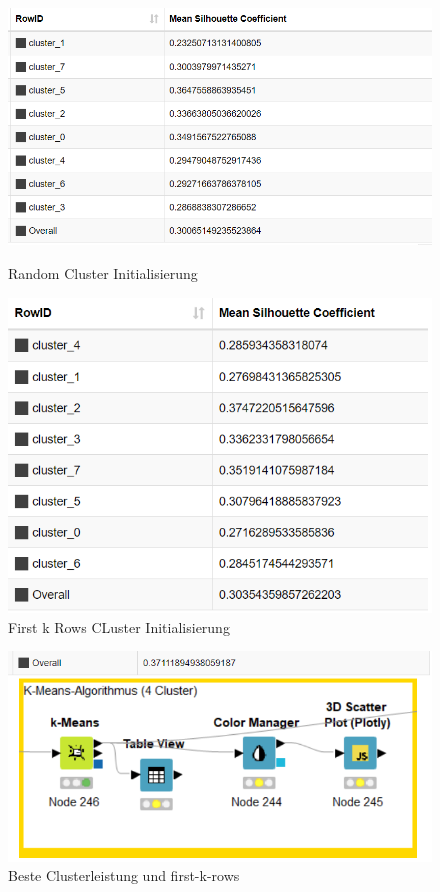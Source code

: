 \documentclass[
	handout,
  	aspectratio=169
]{beamer}
\begin{document}
\begin{frame}
	\begin{figure}[!htb]
\includegraphics[scale=0.5]{../pictures/sil_mean.png}
			 \caption{Random Cluster Initialisierung}
		\endminipage\hfill
			\includegraphics[scale=0.5]{../pictures/sil_firstk.png}
			 \caption{First k Rows CLuster Initialisierung}
		\endminipage\hfill
	\end{figure}
	\end{frame}
	\begin{frame}
	\begin{center}					
					\begin{figure}[h]
						\includegraphics[scale=0.7]{../pictures/best_sil_mean.png}
						\caption{Beste Clusterleistung und first-k-rows}		
					\end{figure}	
				\end{center}	
	\end{frame}
	
\end{document}
